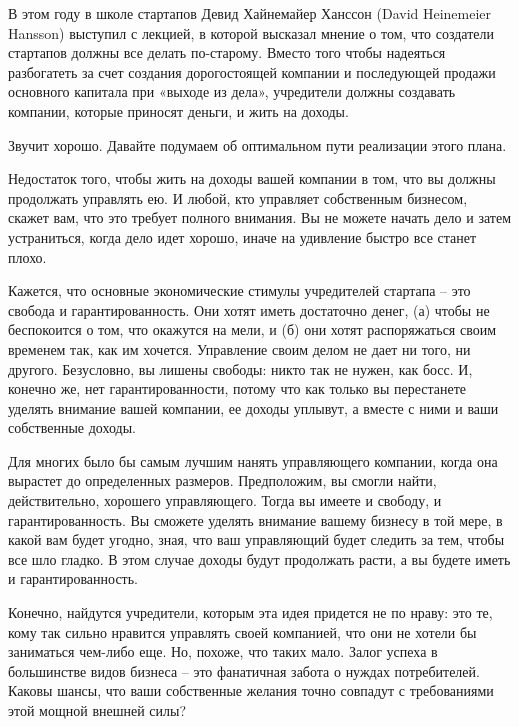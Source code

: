 \documentclass[ebook,12pt,oneside,openany]{memoir}
\begin{document}
\maketitle

В этом году в школе стартапов Девид Хайнемайер Ханссон (David
Heinemeier Hansson) выступил с лекцией, в которой высказал мнение о
том, что создатели стартапов должны все делать по-старому. Вместо того
чтобы надеяться разбогатеть за счет создания дорогостоящей компании и
последующей продажи основного капитала при «выходе из дела»,
учредители должны создавать компании, которые приносят деньги, и жить
на доходы.

Звучит хорошо. Давайте подумаем об оптимальном пути реализации этого
плана.

Недостаток того, чтобы жить на доходы вашей компании в том, что вы
должны продолжать управлять ею. И любой, кто управляет собственным
бизнесом, скажет вам, что это требует полного внимания. Вы не можете
начать дело и затем устраниться, когда дело идет хорошо, иначе на
удивление быстро все станет плохо.

Кажется, что основные экономические стимулы учредителей стартапа --
это свобода и гарантированность. Они хотят иметь достаточно денег, (а)
чтобы не беспокоится о том, что окажутся на мели, и (б) они хотят
распоряжаться своим временем так, как им хочется. Управление своим
делом не дает ни того, ни другого. Безусловно, вы лишены свободы:
никто так не нужен, как босс. И, конечно же, нет гарантированности,
потому что как только вы перестанете уделять внимание вашей компании,
ее доходы уплывут, а вместе с ними и ваши собственные доходы.

Для многих было бы самым лучшим нанять управляющего компании, когда
она вырастет до определенных размеров. Предположим, вы смогли найти,
действительно, хорошего управляющего. Тогда вы имеете и свободу, и
гарантированность. Вы сможете уделять внимание вашему бизнесу в той
мере, в какой вам будет угодно, зная, что ваш управляющий будет
следить за тем, чтобы все шло гладко. В этом случае доходы будут
продолжать расти, а вы будете иметь и гарантированность.

Конечно, найдутся учредители, которым эта идея придется не по нраву:
это те, кому так сильно нравится управлять своей компанией, что они не
хотели бы заниматься чем-либо еще. Но, похоже, что таких мало. Залог
успеха в большинстве видов бизнеса – это фанатичная забота о нуждах
потребителей. Каковы шансы, что ваши собственные желания точно
совпадут с требованиями этой мощной внешней силы?
\end{document}
